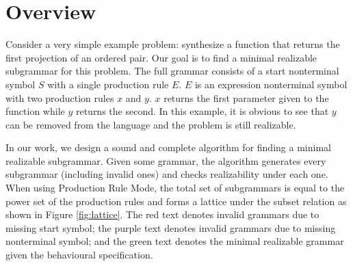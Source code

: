 \documentclass[acmsmall, nonacm]{acmart}
\begin{document}
\section{Overview}



Consider a very simple example problem: synthesize a function that returns the first projection of an ordered pair. Our goal is to find a minimal realizable subgrammar for this problem. The full grammar consists of a start nonterminal symbol $S$ with a single production rule $E$. $E$ is an expression nonterminal symbol with two production rules $x$ and $y$. $x$ returns the first parameter given to the function while $y$ returns the second. In this example, it is obvious to see that $y$ can be removed from the language and the problem is still realizable.

\begin{center}
\label{fig:lattice}
\end{center}

In our work, we design a sound and complete algorithm for finding a minimal realizable subgrammar. Given some grammar, the algorithm generates every subgrammar (including invalid ones) and checks realizability under each one. When using Production Rule Mode, the total set of subgrammars is equal to the power set of the production rules and forms 
a lattice under the subset relation as shown in Figure \ref{fig:lattice}. The red text denotes invalid grammars due to missing start symbol; the purple text denotes invalid grammars due to missing nonterminal symbol; and the green text denotes the minimal realizable grammar given the behavioural specification.
\end{document}
